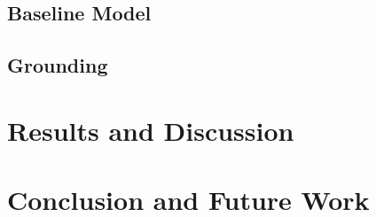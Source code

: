 \documentclass{article}
\begin{document}
\subsection{Baseline Model}

\subsection{Grounding}

\section{Results and Discussion}
\section{Conclusion and Future Work}


\end{document}
